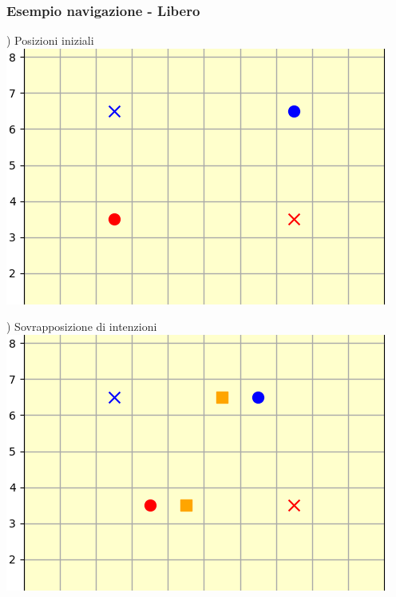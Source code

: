 \documentclass[12pt]{article}
\begin{document}
\subsubsection{Esempio navigazione - Libero}
\vspace{0.2cm}

\begin{minipage}[ht]{0.45\linewidth}
) Posizioni iniziali
\includegraphics[width=\textwidth]{SimulazioniNavigazione/2AGV_NoConflitti/0.png}
\end{minipage}
\begin{minipage}[ht]{0.45\linewidth}
) Sovrapposizione di intenzioni
\includegraphics[width=\textwidth]{SimulazioniNavigazione/2AGV_NoConflitti/1.png}
\end{minipage}\\

\vspace{1cm}
\end{document}
